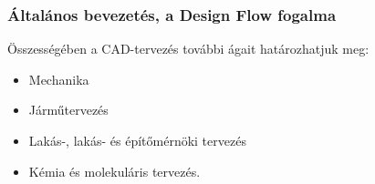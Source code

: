 \documentclass[../labor.tex]{subfiles}
\begin{document}
        \subsubsection{Általános bevezetés, a Design Flow fogalma}

            \noindent Összességében a CAD-tervezés további ágait határozhatjuk meg:

            \begin{itemize}
                \item Mechanika
                \item Járműtervezés
                \item Lakás-, lakás- és építőmérnöki tervezés
                \item Kémia és molekuláris tervezés.
            \end{itemize}
\end{document}
